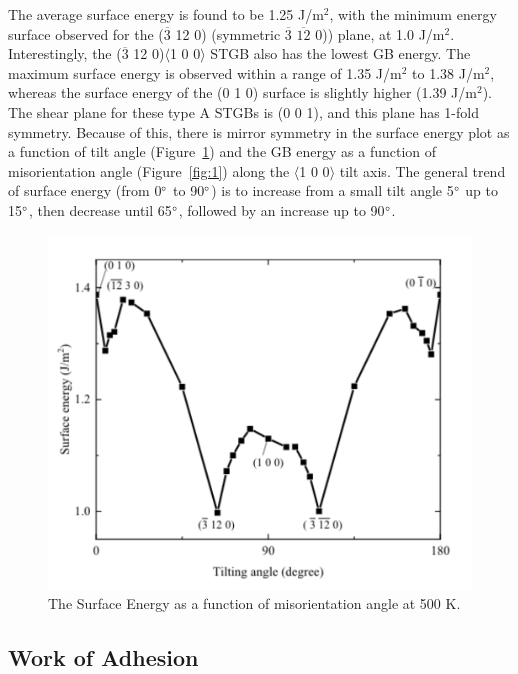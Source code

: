 \documentclass{anstrans}
\begin{document}
The average surface energy is found to be 1.25 J/m${^2}$, with the minimum energy surface observed for the ($\overline{3}$ 12 0) (symmetric $\overline{3}$ $\overline{12}$ 0)) plane, at 1.0 J/m$^2$. Interestingly, the ($\overline{3}$ 12 0)$\langle$1 0 0$\rangle$ STGB also has the lowest GB energy. The maximum surface energy is observed within a range of 1.35 J/m${^2}$ to 1.38 J/m${^2}$, whereas the surface energy of the (0 1 0) surface is slightly higher (1.39 J/m${^2}$). The shear plane for these type A STGBs is (0 0 1), and this plane has 1-fold symmetry. Because of this, there is mirror symmetry in the surface energy plot as a function of tilt angle (Figure~\ref{fig:2}) and the GB energy as a function of misorientation angle (Figure~\ref{fig:1}) along the $\langle$1 0 0$\rangle$ tilt axis. The general trend of surface energy (from 0$\degree$ to 90$\degree$) is to increase from a small tilt angle 5$\degree$ up to 15$\degree$, then decrease until 65$\degree$, followed by an increase up to 90$\degree$.

\begin{figure}[ht] %
  \centering
  \includegraphics[width=\columnwidth]{fig2}
  \caption{The Surface Energy as a function of misorientation angle at 500 K.}
  \label{fig:2}
\end{figure}

\subsection{Work of Adhesion}
\end{document}
